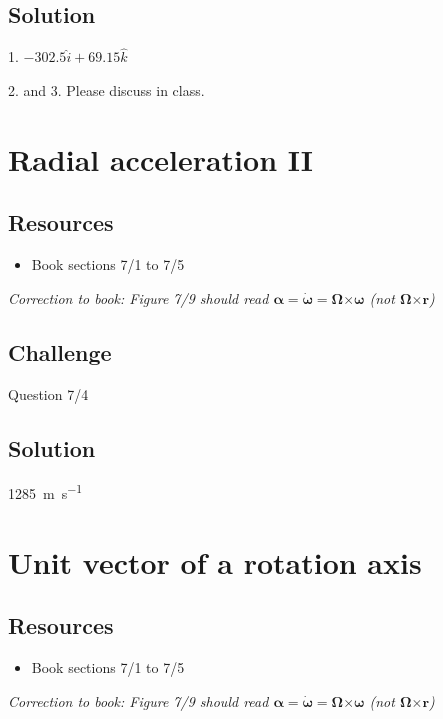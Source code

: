 \subsection*{Solution}
1. $-302.5 \hat{i} + 69.15 \hat{k}$

2. and 3. Please discuss in class.




\newpage
\section{Radial acceleration II}

\subsection*{Resources}
\begin{itemize}
    \item Book sections 7/1 to 7/5
\end{itemize}

\emph{Correction to book: Figure 7/9 should read $\bm{\alpha} = \bm{\dot{\omega}} = \bm{\Omega} \bm{\times} \bm{\omega}$ (not $\bm{\Omega} \bm{\times} \bm{r}$)}

\subsection*{Challenge}
Question 7/4

\subsection*{Solution}
\SI{1285}{\meter\per\second}




\newpage
\section{Unit vector of a rotation axis}

\subsection*{Resources}
\begin{itemize}
    \item Book sections 7/1 to 7/5
\end{itemize}

\emph{Correction to book: Figure 7/9 should read $\bm{\alpha} = \bm{\dot{\omega}} = \bm{\Omega} \bm{\times} \bm{\omega}$ (not $\bm{\Omega} \bm{\times} \bm{r}$)}

